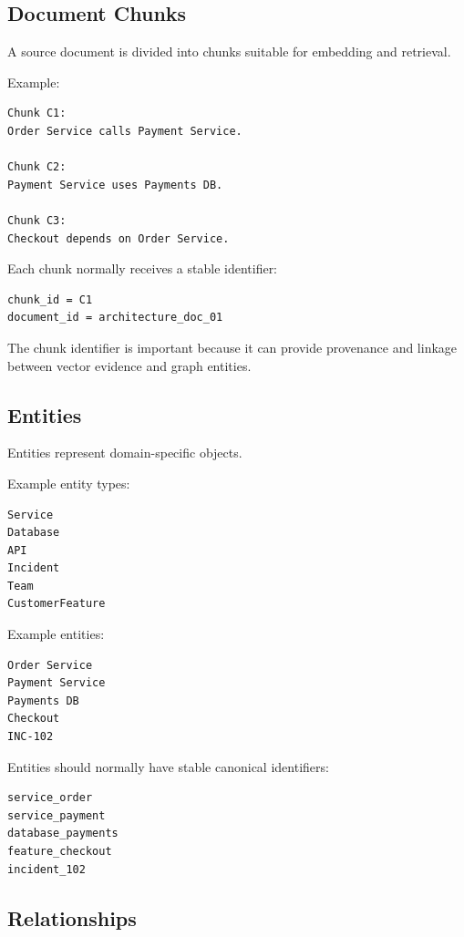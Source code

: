 \documentclass[11pt,a4paper]{article}
\begin{document}
\subsection{Document Chunks}

A source document is divided into chunks suitable for embedding and retrieval.

Example:

\begin{lstlisting}
Chunk C1:
Order Service calls Payment Service.

Chunk C2:
Payment Service uses Payments DB.

Chunk C3:
Checkout depends on Order Service.
\end{lstlisting}

Each chunk normally receives a stable identifier:

\begin{lstlisting}
chunk_id = C1
document_id = architecture_doc_01
\end{lstlisting}

The chunk identifier is important because it can provide provenance and linkage between vector evidence and graph entities.

\subsection{Entities}

Entities represent domain-specific objects.

Example entity types:

\begin{lstlisting}
Service
Database
API
Incident
Team
CustomerFeature
\end{lstlisting}

Example entities:

\begin{lstlisting}
Order Service
Payment Service
Payments DB
Checkout
INC-102
\end{lstlisting}

Entities should normally have stable canonical identifiers:

\begin{lstlisting}
service_order
service_payment
database_payments
feature_checkout
incident_102
\end{lstlisting}

\subsection{Relationships}
\end{document}
